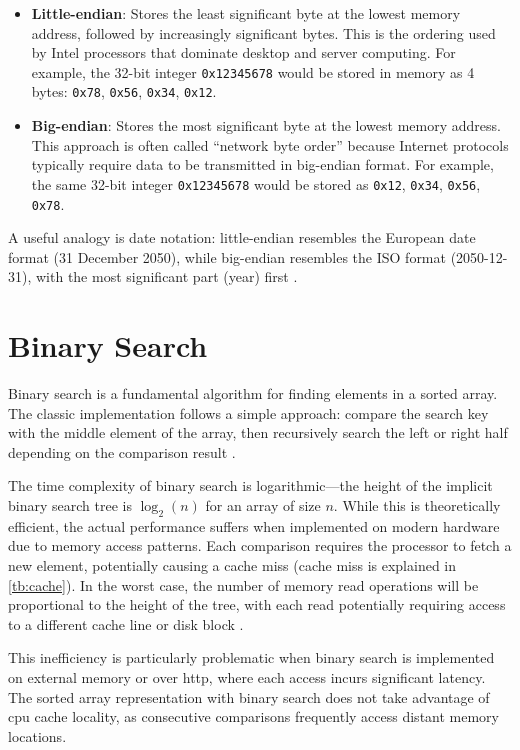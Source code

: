\begin{itemize}
  \item \textbf{Little-endian}: Stores the least significant byte at the lowest memory address, followed by increasingly significant bytes. This is the ordering used by Intel processors that dominate desktop and server computing. For example, the 32-bit integer \texttt{0x12345678} would be stored in memory as 4 bytes: \texttt{0x78}, \texttt{0x56}, \texttt{0x34}, \texttt{0x12}.

  \item \textbf{Big-endian}: Stores the most significant byte at the lowest memory address. This approach is often called ``network byte order'' because Internet protocols typically require data to be transmitted in big-endian format. For example, the same 32-bit integer \texttt{0x12345678} would be stored as \texttt{0x12}, \texttt{0x34}, \texttt{0x56}, \texttt{0x78}.
\end{itemize}

A useful analogy is date notation: little-endian resembles the European date format (31 December 2050), while big-endian resembles the ISO format (2050-12-31), with the most significant part (year) first \citep{endianness_mdn}.

\section{Binary Search}
\label{tb:binary_search}

Binary search is a fundamental algorithm for finding elements in a sorted array. The classic implementation follows a simple approach: compare the search key with the middle element of the array, then recursively search the left or right half depending on the comparison result \citep{binary_search}.

The time complexity of binary search is logarithmic—the height of the implicit binary search tree is $\log_2(n)$ for an array of size $n$. While this is theoretically efficient, the actual performance suffers when implemented on modern hardware due to memory access patterns. Each comparison requires the processor to fetch a new element, potentially causing a cache miss (cache miss is explained in \autoref{tb:cache}). In the worst case, the number of memory read operations will be proportional to the height of the tree, with each read potentially requiring access to a different cache line or disk block \citep{binary_search}.

This inefficiency is particularly problematic when binary search is implemented on external memory or over \ac{http}, where each access incurs significant latency. The sorted array representation with binary search does not take advantage of \ac{cpu} cache locality, as consecutive comparisons frequently access distant memory locations.


